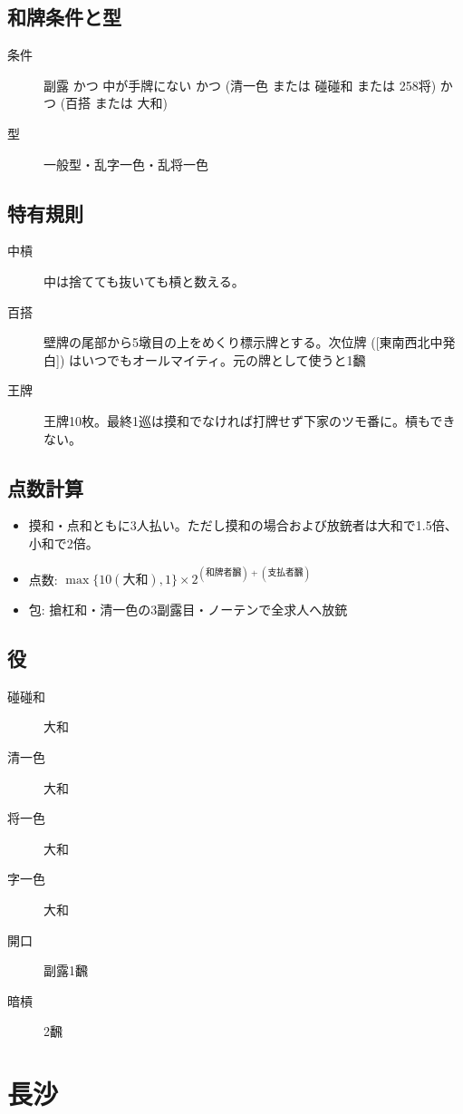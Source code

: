 \documentclass{ltjsarticle}
\begin{document}
\subsection{和牌条件と型}
\begin{description}
    \item[条件] 副露 かつ 中が手牌にない かつ (清一色 または 碰碰和 または 258将) かつ (百搭 または 大和)
    \item[型] 一般型・乱字一色・乱将一色
\end{description}
\subsection{特有規則}
\begin{description}
    \item[中槓] 中は捨てても抜いても槓と数える。
    \item[百搭] 壁牌の尾部から5墩目の上をめくり標示牌とする。次位牌 ([東南西北中発白]) はいつでもオールマイティ。元の牌として使うと1飜
    \item[王牌] 王牌10枚。最終1巡は摸和でなければ打牌せず下家のツモ番に。槓もできない。
\end{description}
\subsection{点数計算}
\begin{itemize}
    \item 摸和・点和ともに3人払い。ただし摸和の場合および放銃者は大和で1.5倍、小和で2倍。
    \item 点数: $\max\{10(\text{大和}), 1\}\times2^{(\text{和牌者飜})+(\text{支払者飜})}$
    \item 包: 搶杠和・清一色の3副露目・ノーテンで全求人へ放銃
\end{itemize}
\subsection{役}
\begin{description}
    \item[碰碰和] 大和
    \item[清一色] 大和
    \item[将一色] 大和
    \item[字一色] 大和
    \item[開口] 副露1飜
    \item[暗槓] 2飜
\end{description}
\section{長沙}
\end{document}
